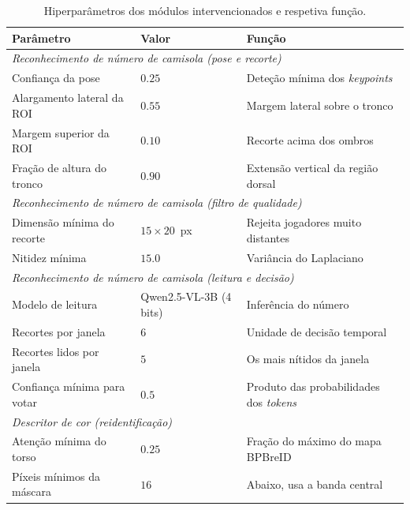 \begin{table}[htbp]
    \centering
    \caption{Hiperparâmetros dos módulos intervencionados e respetiva função.}
    \label{tab:hiperparametros}
    \begin{tabular}{|l|l|l|}
        \hline
        \textbf{Parâmetro} & \textbf{Valor} & \textbf{Função} \\
        \hline
        \multicolumn{3}{|l|}{\emph{Reconhecimento de número de camisola (pose e recorte)}} \\
        \hline
        Confiança da pose            & $0.25$          & Deteção mínima dos \emph{keypoints} \\
        \hline
        Alargamento lateral da ROI   & $0.55$          & Margem lateral sobre o tronco \\
        \hline
        Margem superior da ROI       & $0.10$          & Recorte acima dos ombros \\
        \hline
        Fração de altura do tronco   & $0.90$          & Extensão vertical da região dorsal \\
        \hline
        \multicolumn{3}{|l|}{\emph{Reconhecimento de número de camisola (filtro de qualidade)}} \\
        \hline
        Dimensão mínima do recorte   & $15\times20$~px & Rejeita jogadores muito distantes \\
        \hline
        Nitidez mínima               & $15.0$          & Variância do Laplaciano \\
        \hline
        \multicolumn{3}{|l|}{\emph{Reconhecimento de número de camisola (leitura e decisão)}} \\
        \hline
        Modelo de leitura            & Qwen2.5-VL-3B (4 bits) & Inferência do número \\
        \hline
        Recortes por janela          & $6$             & Unidade de decisão temporal \\
        \hline
        Recortes lidos por janela    & $5$             & Os mais nítidos da janela \\
        \hline
        Confiança mínima para votar  & $0.5$           & Produto das probabilidades dos \emph{tokens} \\
        \hline
        \multicolumn{3}{|l|}{\emph{Descritor de cor (reidentificação)}} \\
        \hline
        Atenção mínima do torso      & $0.25$          & Fração do máximo do mapa BPBreID \\
        \hline
        Píxeis mínimos da máscara    & $16$            & Abaixo, usa a banda central \\

\end{tabular}
\end{table}
